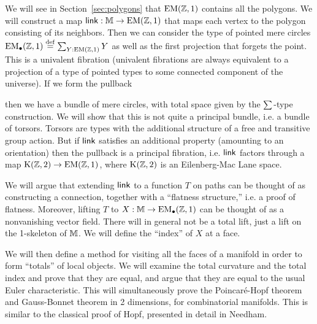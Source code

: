 We will see in Section~\ref{sec:polygons} that \( \mathrm{EM}(\mathbb{Z},1) \) contains all the polygons. We will construct a map \( \operatorname{\mathsf{link}}:\mathbb{M}\to\mathrm{EM}(\mathbb{Z},1) \) that maps each vertex to the polygon consisting of its neighbors. Then we can consider the type of pointed mere circles \( \mathrm{EM_{\bullet}}(\mathbb{Z},1)\stackrel{\mathrm{def}}{=} \sum_{Y:\mathrm{EM}(\mathbb{Z},1)}Y \) as well as the first projection that forgets the point. This is a univalent fibration (univalent fibrations are always equivalent to a projection of a type of pointed types to some connected component of the universe\cite{christensen_univalence}). If we form the pullback
\begin{center}
\end{center}
then we have a bundle of mere circles, with total space given by the \( \sum_{} \)-type construction. We will show that this is not quite a principal bundle, i.e. a bundle of torsors. Torsors are types with the additional structure of a free and transitive group action. But if \( \operatorname{\mathsf{link}}  \) satisfies an additional property (amounting to an orientation) then the pullback is a principal fibration, i.e. \( \operatorname{\mathsf{link}} \) factors through a map \( \mathrm{K}(\mathbb{Z},2)\to\mathrm{EM}(\mathbb{Z},1) \), where \( \mathrm{K}(\mathbb{Z},2) \) is an Eilenberg-Mac Lane space. 

We will argue that extending \( \operatorname{\mathsf{link}} \) to a function \( T \) on paths can be thought of as constructing a connection, together with a ``flatness structure,'' i.e. a proof of flatness. Moreover, lifting \( T \) to \( X:\mathbb{M}\to\mathrm{EM_{\bullet}}(\mathbb{Z},1) \) can be thought of as a nonvanishing vector field. There will in general not be a total lift, just a lift on the 1-skeleton of \( \mathbb{M} \). We will define the ``index'' of \( X \) at a face.

We will then define a method for visiting all the faces of a manifold in order to form ``totals'' of local objects. We will examine the total curvature and the total index and prove that they are equal, and argue that they are equal to the usual Euler characteristic. This will simultaneously prove the Poincaré-Hopf theorem and Gauss-Bonnet theorem in 2 dimensions, for combinatorial manifolds. This is similar to the classical proof of Hopf\cite{hopf}, presented in detail in Needham\cite{needham}.

